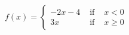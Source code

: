{${\displaystyle f(x) = \left\{ \begin{array}{rcl} -2x - 4 & \mbox{ if } &  x < 0 \\
                                                             3x & \mbox{ if } & x \geq 0 
                                     \end{array} \right. }$}
{
\begin{center}
\end{center}
}